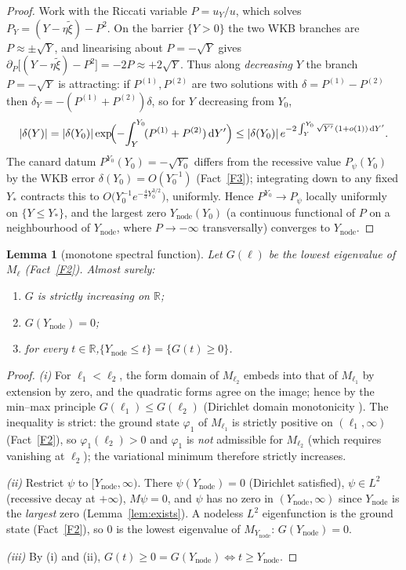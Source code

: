 \documentclass[11pt]{article}
\newtheorem{lemma}{Lemma}
\theoremstyle{definition}
\theoremstyle{remark}
\newcommand{\dd}{\,\mathrm{d}}
\newcommand{\Ynode}{Y_{\mathrm{node}}}
\newcommand{\R}{\mathbb{R}}
\newcommand{\xit}{\widetilde{\xi}}
\begin{document}
\begin{proof}
Work with the Riccati variable $P=u_Y/u$, which solves
$P_Y=(Y-\eta\xit)-P^2$. On the barrier $\{Y>0\}$ the two WKB branches are
$P\approx\pm\sqrt{Y}$, and linearising about $P=-\sqrt Y$ gives
$\partial_P\bigl[(Y-\eta\xit)-P^2\bigr]=-2P\approx+2\sqrt Y$. Thus along \emph{decreasing}
$Y$ the branch $P=-\sqrt Y$ is attracting: if $P^{(1)},P^{(2)}$ are two solutions with
$\delta=P^{(1)}-P^{(2)}$ then $\delta_Y=-(P^{(1)}+P^{(2)})\delta$, so for $Y$ decreasing
from $Y_0$,
\[
  |\delta(Y)|=|\delta(Y_0)|\exp\!\Bigl(-\!\int_Y^{Y_0}\!(P^{(1)}+P^{(2)})\dd Y'\Bigr)
            \le|\delta(Y_0)|\,e^{-2\int_Y^{Y_0}\sqrt{Y'}\,(1+o(1))\dd Y'} .
\]
The canard datum $P^{Y_0}(Y_0)=-\sqrt{Y_0}$ differs from the recessive value
$P_\psi(Y_0)$ by the WKB error $\delta(Y_0)=O(Y_0^{-1})$ (Fact~\ref{F3}); integrating
down to any fixed $Y_*$ contracts this to $O\!\bigl(Y_0^{-1}e^{-\frac43 Y_0^{3/2}}\bigr)$,
uniformly. Hence $P^{Y_0}\to P_\psi$ locally uniformly on $\{Y\le Y_*\}$, and the largest
zero $\Ynode(Y_0)$ (a continuous functional of $P$ on a neighbourhood of $\Ynode$, where
$P\to-\infty$ transversally) converges to $\Ynode$.
\end{proof}

\begin{lemma}[monotone spectral function]\label{lem:mono}
Let $G(\ell)$ be the lowest eigenvalue of $M_\ell$ (Fact~\ref{F2}). Almost surely:
\begin{enumerate}
\item[\textup{(i)}] $G$ is strictly increasing on $\R$;
\item[\textup{(ii)}] $G(\Ynode)=0$;
\item[\textup{(iii)}] for every $t\in\R$,\quad $\{\Ynode\le t\}=\{G(t)\ge0\}$.
\end{enumerate}
\end{lemma}

\begin{proof}
\textit{(i)} For $\ell_1<\ell_2$, the form domain of $M_{\ell_2}$ embeds into that of
$M_{\ell_1}$ by extension by zero, and the quadratic forms agree on the image; hence by
the min--max principle $G(\ell_1)\le G(\ell_2)$ (Dirichlet domain monotonicity
\cite[XIII]{RS}). The inequality is strict: the ground state $\varphi_1$ of $M_{\ell_1}$
is strictly positive on $(\ell_1,\infty)$ (Fact~\ref{F2}), so $\varphi_1(\ell_2)>0$ and
$\varphi_1$ is \emph{not} admissible for $M_{\ell_2}$ (which requires vanishing at
$\ell_2$); the variational minimum therefore strictly increases.

\textit{(ii)} Restrict $\psi$ to $[\Ynode,\infty)$. There $\psi(\Ynode)=0$ (Dirichlet
satisfied), $\psi\in L^2$ (recessive decay at $+\infty$), $M\psi=0$, and $\psi$ has no
zero in $(\Ynode,\infty)$ since $\Ynode$ is the \emph{largest} zero
(Lemma~\ref{lem:exists}). A nodeless $L^2$ eigenfunction is the ground state
(Fact~\ref{F2}), so $0$ is the lowest eigenvalue of $M_{\Ynode}$: $G(\Ynode)=0$.

\textit{(iii)} By (i) and (ii), $G(t)\ge0=G(\Ynode)\iff t\ge\Ynode$.
\end{proof}
\end{document}
